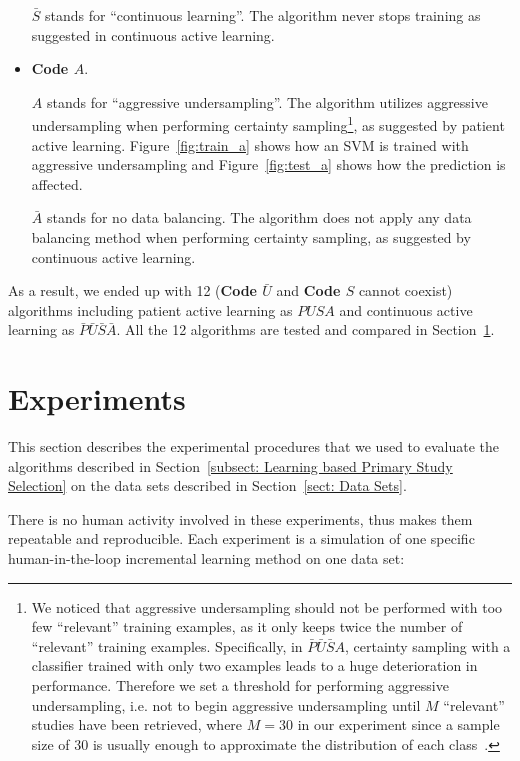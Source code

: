 \documentclass[final,twocolumn,5p]{elsarticle}
\theoremstyle{break}
\begin{document}
\begin{itemize}
\textbf{$\bar{S}$} stands for ``continuous learning''. The algorithm never stops
training as suggested in continuous active learning.

\item
{\bf Code $A$}. 

\textbf{$A$} stands for ``aggressive undersampling''. The algorithm utilizes aggressive undersampling when performing certainty sampling\footnote{We noticed that aggressive undersampling should not be performed with too few ``relevant'' training examples, as it only keeps twice the number of ``relevant'' training examples. Specifically, in $\bar{P}\bar{U}\bar{S}A$, certainty sampling with a classifier trained with only two examples leads to a huge deterioration in performance. Therefore we set a threshold for performing aggressive undersampling, i.e. not to begin aggressive undersampling until $M$ ``relevant'' studies have been retrieved, where $M=30$ in our experiment since a sample size of $30$ is usually
enough to approximate the distribution of each class~\cite{isotalo2001basics}.}, as suggested by patient active learning. Figure~\ref{fig:train_a} shows how an SVM is trained with aggressive undersampling and Figure~\ref{fig:test_a} shows how the prediction is affected.

\textbf{$\bar{A}$} stands for no data balancing. The algorithm does not apply any data balancing method when performing certainty sampling, as suggested by continuous active learning.

\end{itemize}

As a result, we ended up with 12 (\textbf{Code $\bar{U}$} and \textbf{Code $S$} cannot coexist) algorithms including patient active learning as $PUSA$ and continuous active learning as $\bar{P}\bar{U}\bar{S}\bar{A}$. All the 12 algorithms are tested and compared in Section~\ref{sect: Experiments}.

\section{Experiments}
\label{sect: Experiments}

This section describes the experimental procedures that we used to evaluate the algorithms described in Section~\ref{subsect: Learning based Primary Study Selection} on the data sets described in Section~\ref{sect: Data Sets}. 

There is no human activity involved in these experiments, thus makes them repeatable and reproducible. Each experiment is a simulation of one specific human-in-the-loop incremental learning method on one data set:
\end{document}
